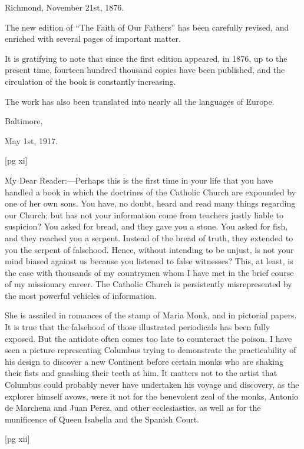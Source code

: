 Richmond,
November 21st, 1876.


The new edition of “The Faith of Our Fathers”
has been carefully revised, and enriched with several
pages of important matter.

It is gratifying to note that since the first edition
appeared, in 1876, up to the present time, fourteen
hundred thousand copies have been published, and
the circulation of the book is constantly increasing.

The work has also been translated into nearly
all the languages of Europe.

Baltimore,

May 1st, 1917.

[pg xi]


My Dear Reader:—Perhaps this is the first time
in your life that you have handled a book in which
the doctrines of the Catholic Church are expounded
by one of her own sons. You have, no
doubt, heard and read many things regarding our
Church; but has not your information come from
teachers justly liable to suspicion? You asked for
bread, and they gave you a stone. You asked for
fish, and they reached you a serpent. Instead of the
bread of truth, they extended to you the serpent of
falsehood. Hence, without intending to be unjust,
is not your mind biased against us because
you listened to false witnesses? This, at least, is
the case with thousands of my countrymen whom
I have met in the brief course of my missionary
career. The Catholic Church is persistently misrepresented
by the most powerful vehicles of information.

She is assailed in romances of the stamp of Maria
Monk, and in pictorial papers. It is true that the
falsehood of those illustrated periodicals has been
fully exposed. But the antidote often comes too
late to counteract the poison. I have seen a picture
representing Columbus trying to demonstrate the
practicability of his design to discover a new Continent
before certain monks who are shaking their
fists and gnashing their teeth at him. It matters
not to the artist that Columbus could probably
never have undertaken his voyage and discovery,
as the explorer himself avows, were it not for the
benevolent zeal of the monks, Antonio de Marchena
and Juan Perez, and other ecclesiastics, as
well as for the munificence of Queen Isabella and
the Spanish Court.

[pg xii]

